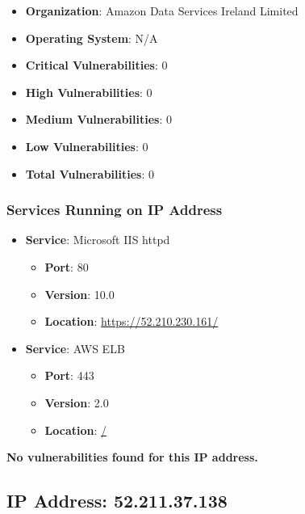 \documentclass{article}
\begin{document}
\begin{itemize}
    \item \textbf{Organization}: Amazon Data Services Ireland Limited
    \item \textbf{Operating System}:  N/A 
    \item \textbf{Critical Vulnerabilities}: 0
    \item \textbf{High Vulnerabilities}: 0
    \item \textbf{Medium Vulnerabilities}: 0
    \item \textbf{Low Vulnerabilities}: 0
    \item \textbf{Total Vulnerabilities}: 0
\end{itemize}

\subsubsection*{Services Running on IP Address}

\begin{itemize}
    
        \item \textbf{Service}: Microsoft IIS httpd
        \begin{itemize}
            \item \textbf{Port}: 80
            \item \textbf{Version}:  10.0 
            \item \textbf{Location}: \href{ https://52.210.230.161/ }{ https://52.210.230.161/ }
        \end{itemize}
    
        \item \textbf{Service}: AWS ELB
        \begin{itemize}
            \item \textbf{Port}: 443
            \item \textbf{Version}:  2.0 
            \item \textbf{Location}: \href{ / }{ / }
        \end{itemize}
    
\end{itemize}


\textbf{No vulnerabilities found for this IP address.}




\clearpage



\subsection*{IP Address: 52.211.37.138}
\end{document}

